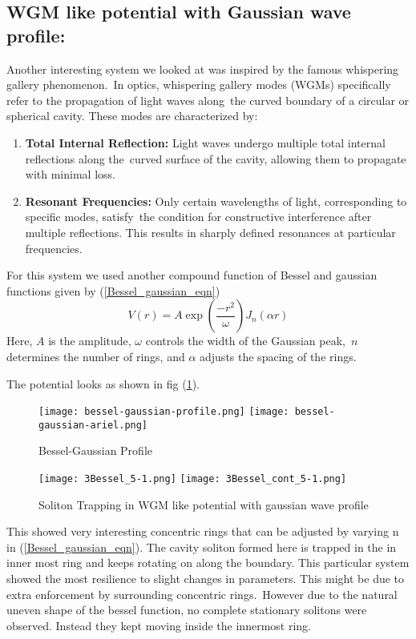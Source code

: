 \subsection{WGM like potential with Gaussian wave profile:}
Another interesting system we looked at was inspired by the famous whispering gallery phenomenon.\
In optics, whispering gallery modes (WGMs) specifically refer to the propagation of light waves along\
the curved boundary of a circular or spherical cavity. These modes are characterized by:
\begin{enumerate}
    \item \textbf{Total Internal Reflection:} Light waves undergo multiple total internal reflections along the\
    curved surface of the cavity, allowing them to propagate with minimal loss.
    \item \textbf{Resonant Frequencies:} Only certain wavelengths of light, corresponding to specific modes, satisfy\
    the condition for constructive interference after multiple reflections. This results in sharply defined resonances at particular frequencies.
\end{enumerate}

For this system we used another compound function of Bessel and gaussian functions given by (\ref{Bessel_gaussian_eqn})
\begin{equation}
    V(r) = A \exp(\frac{-r^2}{\omega}) J_n(\alpha r) \label{Bessel_gaussian_eqn}
\end{equation}
Here,  $A$  is the amplitude, $\omega$ controls the width of the Gaussian peak,\
$n $ determines the number of rings, and  $\alpha$  adjusts the spacing of the rings.

The potential looks as shown in fig (\ref{fig:bessel_gaussian_profile}).
\begin{figure}[H]
    \texttt{[image: bessel-gaussian-profile.png]}
    \texttt{[image: bessel-gaussian-ariel.png]}
    \caption{Bessel-Gaussian Profile}
    \label{fig:bessel_gaussian_profile}
\end{figure}

\begin{figure}[H]
    \texttt{[image: 3Bessel\_5-1.png]}
    \texttt{[image: 3Bessel\_cont\_5-1.png]}
    \caption{Soliton Trapping in WGM like potential with gaussian wave profile} 
        \label{fig:WGM_potential_with_gaussian_profile}
\end{figure}

This showed very interesting concentric rings that can be adjusted by varying n in (\ref{Bessel_gaussian_eqn}).
The cavity soliton formed here is trapped in the in inner most ring and keeps rotating on along the boundary.
This particular system showed the most resilience to slight changes in parameters. This might be due to extra enforcement by surrounding concentric rings.\
However due to the natural uneven shape of the bessel function, no complete stationary solitons were observed. Instead they kept moving inside the innermost ring.

